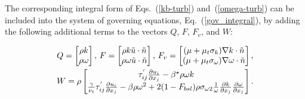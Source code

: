 
The corresponding integral form of Eqs.~(\ref{kb-turb}) and~(\ref{omega-turb})
can be included into the system of governing equations,
Eq.~(\ref{gov_integral}), by adding the
following additional terms to the vectors $Q$, $F$, $F_v$, and $W$:

\begin{multline}
Q =
\begin{bmatrix}
\rho k \\
\rho \omega \\
\end{bmatrix}
,\,
F =
\begin{bmatrix}
\rho k \Tilde{u} \cdot \Tilde{n}\\
\rho \omega \Tilde{u} \cdot \Tilde{n} \\
\end{bmatrix}
, \,
F_v =
\begin{bmatrix}
(\mu+\mu_t\sigma_k)\nabla k \cdot \Tilde{n} \\
(\mu+\mu_t\sigma_\omega)\nabla \omega \cdot \Tilde{n} \\
\end{bmatrix}
, \\
W =\rho
\begin{bmatrix}
\tau_{ij}^{'}\frac{\partial u_i}{\partial x_j}-\beta^{\star}\rho\omega k\\
\frac{\gamma}{\nu_{t}}\tau_{ij}^{'}\frac{\partial u_i}
{\partial x_j} - \beta \rho \omega^{2}+2(1-F_{bsl})\rho 
\sigma_{\omega 2} \frac{1}{\omega} \frac{\partial k}
{\partial x_{j}} \frac{\partial \omega}{\partial x_{j}}\\
\end{bmatrix}.
\end{multline}

